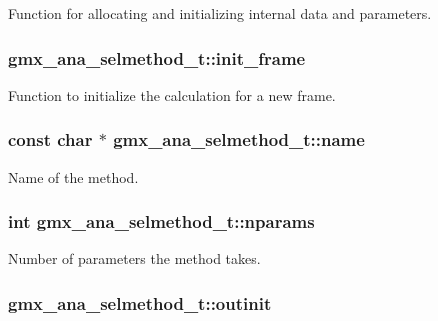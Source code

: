 \-Function for allocating and initializing internal data and parameters. \hypertarget{structgmx__ana__selmethod__t_a367958d476cfb7c4e97547fbceb078fc}{
\subsubsection[{init\-\_\-frame}]{ {\bf gmx\-\_\-ana\-\_\-selmethod\-\_\-t\-::init\-\_\-frame}}}\label{structgmx__ana__selmethod__t_a367958d476cfb7c4e97547fbceb078fc}
\-Function to initialize the calculation for a new frame. \hypertarget{structgmx__ana__selmethod__t_a0755901dbda3e21efbd040caee67d713}{
\subsubsection[{name}]{\setlength{\rightskip}{0pt plus 5cm}const char $\ast$ {\bf gmx\-\_\-ana\-\_\-selmethod\-\_\-t\-::name}}}\label{structgmx__ana__selmethod__t_a0755901dbda3e21efbd040caee67d713}
\-Name of the method. \hypertarget{structgmx__ana__selmethod__t_a228c74499a9dd95033bbaa3fcda7f5e5}{
\subsubsection[{nparams}]{\setlength{\rightskip}{0pt plus 5cm}int {\bf gmx\-\_\-ana\-\_\-selmethod\-\_\-t\-::nparams}}}\label{structgmx__ana__selmethod__t_a228c74499a9dd95033bbaa3fcda7f5e5}
\-Number of parameters the method takes. \hypertarget{structgmx__ana__selmethod__t_ab6f368546e7a0605669f6ffa9a4e1184}{
\subsubsection[{outinit}]{ {\bf gmx\-\_\-ana\-\_\-selmethod\-\_\-t\-::outinit}}}\label{structgmx__ana__selmethod__t_ab6f368546e7a0605669f6ffa9a4e1184}
